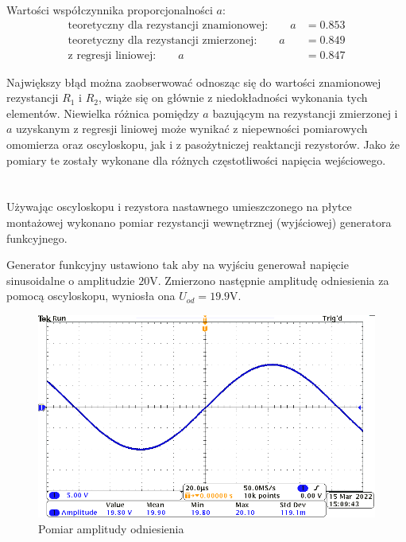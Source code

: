 \documentclass[11pt]{extarticle}
\begin{document}
	Wartości współczynnika proporcjonalności \(a\):
	\begin{align}
		\text{teoretyczny dla rezystancji znamionowej:} \qquad a &= 0.853 \\
		\text{teoretyczny dla rezystancji zmierzonej:} \qquad a &= 0.849 \\
		\text{z regresji liniowej:} \qquad a &= 0.847
	\end{align}

	Największy błąd można zaobserwować odnosząc się do wartości znamionowej rezystancji \(R_1\) i \(R_2\), wiąże się on głównie z niedokładności wykonania tych elementów.
	Niewielka różnica pomiędzy \(a\) bazującym na rezystancji zmierzonej i \(a\) uzyskanym z regresji liniowej może wynikać z niepewności pomiarowych omomierza oraz oscyloskopu, jak i z pasożytniczej reaktancji rezystorów.
	Jako że pomiary te zostały wykonane dla różnych częstotliwości napięcia wejściowego.

	\section{}
	Używając oscyloskopu i rezystora nastawnego umieszczonego na płytce montażowej wykonano pomiar rezystancji wewnętrznej (wyjściowej) generatora funkcyjnego.

	Generator funkcyjny ustawiono tak aby na wyjściu generował napięcie sinusoidalne o amplitudzie \(20\)V.
	Zmierzono następnie amplitudę odniesienia za pomocą oscyloskopu, wyniosła ona \(U_{od}=19.9\)V.

	\begin{figure}[htp]
		\centering
		\includegraphics[width=\textwidth]{include/5/ref.png}
		\caption{Pomiar amplitudy odniesienia}
	\end{figure}
\end{document}
